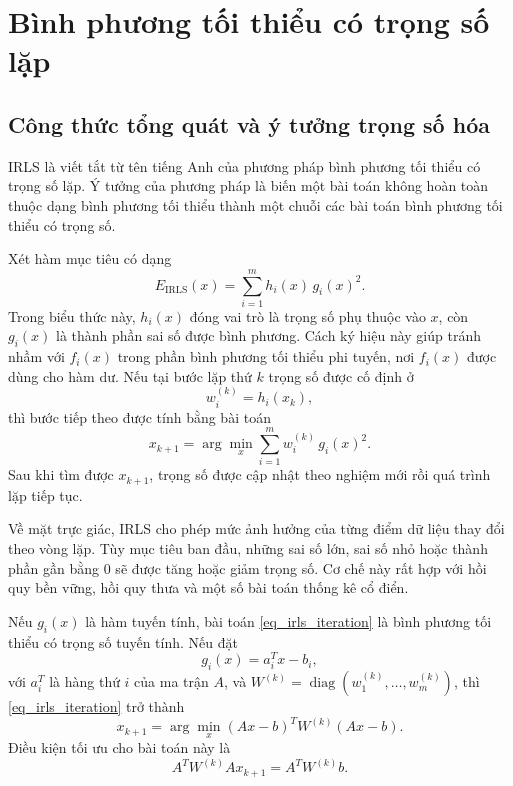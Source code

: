 
\section{Bình phương tối thiểu có trọng số lặp}
\label{SEC_irls}

\subsection{Công thức tổng quát và ý tưởng trọng số hóa}
\label{SUB_SEC_irls_tong_quat}
IRLS là viết tắt từ tên tiếng Anh của phương pháp bình phương tối thiểu có trọng số lặp. Ý tưởng của phương pháp là biến một bài toán không hoàn toàn thuộc dạng bình phương tối thiểu thành một chuỗi các bài toán bình phương tối thiểu có trọng số.
\medskip

Xét hàm mục tiêu có dạng
\begin{equation}
    E_{\mathrm{IRLS}}(x)
    =
    \sum_{i=1}^{m} h_i(x)\,g_i(x)^2.
    \label{eq_irls_general}
\end{equation}
Trong biểu thức này, $h_i(x)$ đóng vai trò là trọng số phụ thuộc vào $x$, còn $g_i(x)$ là thành phần sai số được bình phương. Cách ký hiệu này giúp tránh nhầm với $f_i(x)$ trong phần bình phương tối thiểu phi tuyến, nơi $f_i(x)$ được dùng cho hàm dư. Nếu tại bước lặp thứ $k$ trọng số được cố định ở
\begin{equation}
    w_i^{(k)}=h_i(x_k),
    \label{eq_irls_weight_fixed}
\end{equation}
thì bước tiếp theo được tính bằng bài toán
\begin{equation}
    x_{k+1}
    =
    \arg\min_x
    \sum_{i=1}^{m} w_i^{(k)}\,g_i(x)^2.
    \label{eq_irls_iteration}
\end{equation}
Sau khi tìm được $x_{k+1}$, trọng số được cập nhật theo nghiệm mới rồi quá trình lặp tiếp tục.
\medskip

Về mặt trực giác, IRLS cho phép mức ảnh hưởng của từng điểm dữ liệu thay đổi theo vòng lặp. Tùy mục tiêu ban đầu, những sai số lớn, sai số nhỏ hoặc thành phần gần bằng $0$ sẽ được tăng hoặc giảm trọng số. Cơ chế này rất hợp với hồi quy bền vững, hồi quy thưa và một số bài toán thống kê cổ điển.
\medskip

Nếu $g_i(x)$ là hàm tuyến tính, bài toán \eqref{eq_irls_iteration} là bình phương tối thiểu có trọng số tuyến tính. Nếu đặt
\begin{equation}
    g_i(x)=a_i^{T}x-b_i,
    \label{eq_linear_residual_irls}
\end{equation}
với $a_i^{T}$ là hàng thứ $i$ của ma trận $A$, và $W^{(k)}=\operatorname{diag}(w_1^{(k)},\dots,w_m^{(k)})$, thì \eqref{eq_irls_iteration} trở thành
\begin{equation}
    x_{k+1}
    =
    \arg\min_x
    (Ax-b)^{T}W^{(k)}(Ax-b).
    \label{eq_weighted_ls_matrix}
\end{equation}
Điều kiện tối ưu cho bài toán này là
\begin{equation}
    A^{T}W^{(k)}A x_{k+1}=A^{T}W^{(k)}b.
    \label{eq_weighted_normal_equation}
\end{equation}

